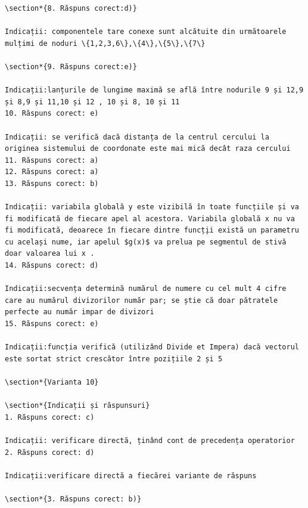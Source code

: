 \documentclass[10pt]{article}
\begin{document}
\begin{verbatim}
\section*{8. Răspuns corect:d)}

Indicații: componentele tare conexe sunt alcătuite din următoarele mulțimi de noduri \{1,2,3,6\},\{4\},\{5\},\{7\}

\section*{9. Răspuns corect:e)}

Indicații:lanțurile de lungime maximă se află între nodurile 9 și 12,9 și 8,9 și 11,10 și 12 , 10 și 8, 10 și 11
10. Răspuns corect: e)

Indicații: se verifică dacă distanța de la centrul cercului la originea sistemului de coordonate este mai mică decât raza cercului
11. Răspuns corect: a)
12. Răspuns corect: a)
13. Răspuns corect: b)

Indicații: variabila globală y este vizibilă în toate funcțiile și va fi modificată de fiecare apel al acestora. Variabila globală x nu va fi modificată, deoarece în fiecare dintre funcț̦ii există un parametru cu același nume, iar apelul $g(x)$ va prelua pe segmentul de stivă doar valoarea lui x .
14. Răspuns corect: d)

Indicații:secvența determină numărul de numere cu cel mult 4 cifre care au numărul divizorilor număr par; se știe că doar pătratele perfecte au număr impar de divizori
15. Răspuns corect: e)

Indicații:funcția verifică (utilizând Divide et Impera) dacă vectorul este sortat strict crescător între pozițiile 2 și 5

\section*{Varianta 10}

\section*{Indicații și răspunsuri}
1. Răspuns corect: c)

Indicații: verificare directă, ținând cont de precedența operatorior
2. Răspuns corect: d)

Indicații:verificare directă a fiecărei variante de răspuns

\section*{3. Răspuns corect: b)}


\end{verbatim}
\end{document}
